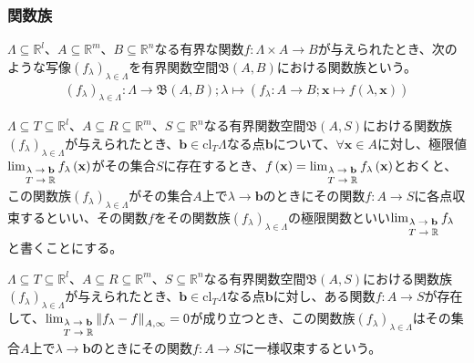 \documentclass[dvipdfmx]{jsarticle}
\begin{document}
\subsubsection{関数族}%
\begin{dfn}
$\varLambda \subseteq \mathbb{R}^{l}$、$A \subseteq \mathbb{R}^{m}$、$B \subseteq \mathbb{R}^{n}$なる有界な関数$f:\varLambda \times A \rightarrow B$が与えられたとき、次のような写像$\left( f_{\lambda} \right)_{\lambda \in \varLambda}$を有界関数空間$\mathfrak{B}(A,B)$における関数族という。
\begin{align*}
\left( f_{\lambda} \right)_{\lambda \in \varLambda}:\varLambda \rightarrow \mathfrak{B}(A,B);\lambda \mapsto \left( f_{\lambda}:A \rightarrow B;\mathbf{x} \mapsto f\left( \lambda,\mathbf{x} \right) \right)
\end{align*}
\end{dfn}
\begin{dfn}
$\varLambda \subseteq T \subseteq \mathbb{R}^{l}$、$A \subseteq R \subseteq \mathbb{R}^{m}$、$S \subseteq \mathbb{R}^{n}$なる有界関数空間$\mathfrak{B}(A,S)$における関数族$\left( f_{\lambda} \right)_{\lambda \in \varLambda}$が与えられたとき、$\mathbf{b} \in \mathrm{cl}_{T}\varLambda$なる点$\mathbf{b}$について、$\forall\mathbf{x} \in A$に対し、極限値$\lim_{\scriptsize \begin{matrix} \lambda \rightarrow \mathbf{b} \\ T \rightarrow \mathbb{R} \end{matrix}}{f_{\lambda}\left( \mathbf{x} \right)}$がその集合$S$に存在するとき、$f\left( \mathbf{x} \right) = \lim_{\scriptsize \begin{matrix} \lambda \rightarrow \mathbf{b} \\ T \rightarrow \mathbb{R} \end{matrix}}{f_{\lambda}\left( \mathbf{x} \right)}$とおくと、この関数族$\left( f_{\lambda} \right)_{\lambda \in \varLambda}$がその集合$A$上で$\lambda \rightarrow \mathbf{b}$のときにその関数$f:A \rightarrow S$に各点収束するといい、その関数$f$をその関数族$\left( f_{\lambda} \right)_{\lambda \in \varLambda}$の極限関数といい$\lim_{\scriptsize \begin{matrix} \lambda \rightarrow \mathbf{b} \\ T \rightarrow \mathbb{R} \end{matrix}}f_{\lambda}$と書くことにする。
\end{dfn}
\begin{dfn}
$\varLambda \subseteq T \subseteq \mathbb{R}^{l}$、$A \subseteq R \subseteq \mathbb{R}^{m}$、$S \subseteq \mathbb{R}^{n}$なる有界関数空間$\mathfrak{B}(A,S)$における関数族$\left( f_{\lambda} \right)_{\lambda \in \varLambda}$が与えられたとき、$\mathbf{b} \in \mathrm{cl}_{T}\varLambda$なる点$\mathbf{b}$に対し、ある関数$f:A \rightarrow S$が存在して、$\lim_{\scriptsize \begin{matrix} \lambda \rightarrow \mathbf{b} \\ T \rightarrow \mathbb{R} \end{matrix}}\left\| f_{\lambda} - f \right\|_{A,\infty} = 0$が成り立つとき、この関数族$\left( f_{\lambda} \right)_{\lambda \in \varLambda}$はその集合$A$上で$\lambda \rightarrow \mathbf{b}$のときにその関数$f:A \rightarrow S$に一様収束するという。
\end{dfn}
\end{document}
